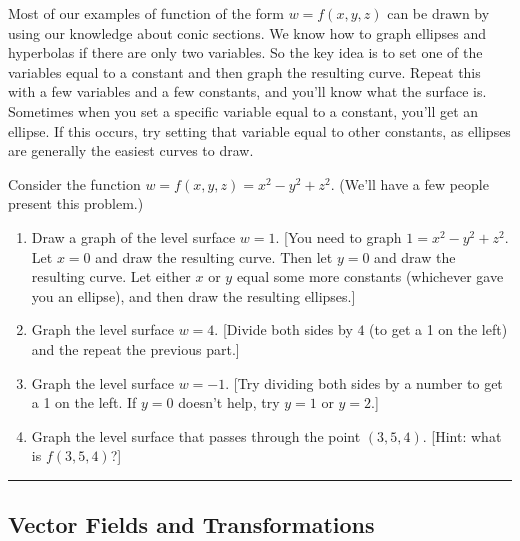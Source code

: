 Most of our examples of function of the form $w=f(x,y,z)$ can be drawn by using our knowledge about conic sections. We know how to graph ellipses and hyperbolas if there are only two variables. So the key idea is to set one of the variables equal to a constant and then graph the resulting curve.  Repeat this with a few variables and a few constants, and you'll know what the surface is. Sometimes when you set a specific variable equal to a constant, you'll get an ellipse. If this occurs, try setting that variable equal to other constants, as ellipses are generally the easiest curves to draw.

\begin{problem}%
 Consider the function $w=f(x,y,z)=x^2-y^2+z^2$. (We'll have a few people present this problem.)
 \begin{enumerate}
  \item Draw a graph of the level surface $w=1$. [You need to graph $1=x^2-y^2+z^2$. Let $x=0$ and draw the resulting curve. Then let $y=0$ and draw the resulting curve. Let either $x$ or $y$ equal some more constants (whichever gave you an ellipse), and then draw the resulting ellipses.]  
  \item Graph the level surface $w=4$. [Divide both sides by $4$ (to get a 1 on the left) and the repeat the previous part.]
  \item Graph the level surface $w=-1$. [Try dividing both sides by a number to get a 1 on the left. If $y=0$ doesn't help, try $y=1$ or $y=2$.]
  \item Graph the level surface that passes through the point $(3,5,4)$. [Hint: what is $f(3,5,4)$?]
 \end{enumerate}
\hrule\end{problem}


\subsection{Vector Fields and Transformations}

